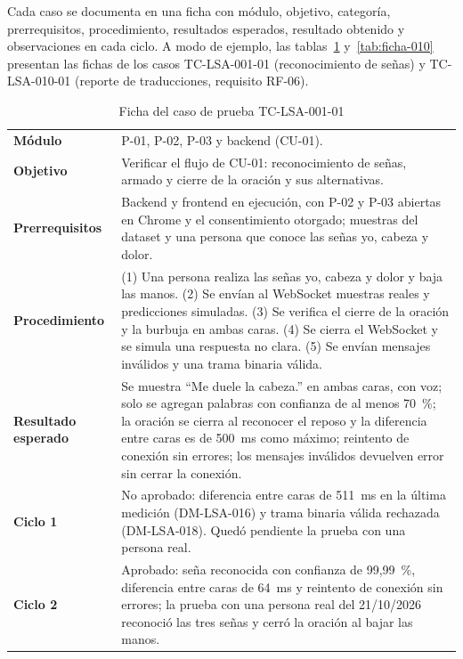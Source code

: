 Cada caso se documenta en una ficha con módulo, objetivo, categoría, prerrequisitos, procedimiento, resultados esperados, resultado obtenido y observaciones en cada ciclo. A modo de ejemplo, las tablas~\ref{tab:ficha-001} y~\ref{tab:ficha-010} presentan las fichas de los casos TC-LSA-001-01 (reconocimiento de señas) y TC-LSA-010-01 (reporte de traducciones, requisito RF-06).

\begin{table}[H]
  \centering
  \caption{Ficha del caso de prueba TC-LSA-001-01}\label{tab:ficha-001}
  \small
  \begin{tabularx}{\textwidth}{>{\raggedright\arraybackslash}p{3.3cm} X}
    \toprule
    \textbf{Módulo} & P-01, P-02, P-03 y backend (CU-01). \\
    \textbf{Objetivo} & Verificar el flujo de CU-01: reconocimiento de señas, armado y cierre de la oración y sus alternativas. \\
    \textbf{Prerrequisitos} & Backend y frontend en ejecución, con P-02 y P-03 abiertas en Chrome y el consentimiento otorgado; muestras del dataset y una persona que conoce las señas yo, cabeza y dolor. \\
    \textbf{Procedimiento} & (1) Una persona realiza las señas yo, cabeza y dolor y baja las manos. (2) Se envían al WebSocket muestras reales y predicciones simuladas. (3) Se verifica el cierre de la oración y la burbuja en ambas caras. (4) Se cierra el WebSocket y se simula una respuesta no clara. (5) Se envían mensajes inválidos y una trama binaria válida. \\
    \textbf{Resultado esperado} & Se muestra ``Me duele la cabeza.'' en ambas caras, con voz; solo se agregan palabras con confianza de al menos 70~\%; la oración se cierra al reconocer el reposo y la diferencia entre caras es de 500~ms como máximo; reintento de conexión sin errores; los mensajes inválidos devuelven error sin cerrar la conexión. \\
    \textbf{Ciclo 1} & No aprobado: diferencia entre caras de 511~ms en la última medición (DM-LSA-016) y trama binaria válida rechazada (DM-LSA-018). Quedó pendiente la prueba con una persona real. \\
    \textbf{Ciclo 2} & Aprobado: seña reconocida con confianza de 99,99~\%, diferencia entre caras de 64~ms y reintento de conexión sin errores; la prueba con una persona real del 21/10/2026 reconoció las tres señas y cerró la oración al bajar las manos. \\
    \bottomrule
  \end{tabularx}
\end{table}

